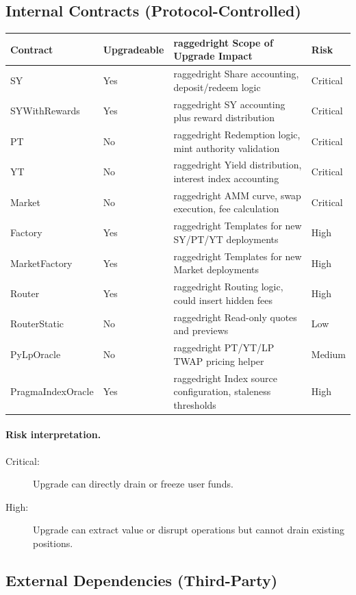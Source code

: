 \subsection{Internal Contracts (Protocol-Controlled)}

\begin{center}
\begin{tabularx}{\textwidth}{l l >{raggedright\arraybackslash}X l}
\toprule
\textbf{Contract} & \textbf{Upgradeable} & \textbf{Scope of Upgrade Impact} & \textbf{Risk} \\
\midrule
SY & Yes & Share accounting, deposit/redeem logic & Critical \\
SYWithRewards & Yes & SY accounting plus reward distribution & Critical \\
PT & No & Redemption logic, mint authority validation & Critical \\
YT & No & Yield distribution, interest index accounting & Critical \\
Market & No & AMM curve, swap execution, fee calculation & Critical \\
Factory & Yes & Templates for new SY/PT/YT deployments & High \\
MarketFactory & Yes & Templates for new Market deployments & High \\
Router & Yes & Routing logic, could insert hidden fees & High \\
RouterStatic & No & Read-only quotes and previews & Low \\
PyLpOracle & No & PT/YT/LP TWAP pricing helper & Medium \\
PragmaIndexOracle & Yes & Index source configuration, staleness thresholds & High \\
\bottomrule
\end{tabularx}
\end{center}

\paragraph{Risk interpretation.}
\begin{description}
\item[Critical:] Upgrade can directly drain or freeze user funds.
\item[High:] Upgrade can extract value or disrupt operations but cannot drain existing positions.
\end{description}

\subsection{External Dependencies (Third-Party)}

